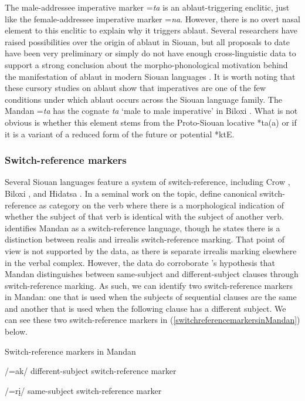The male-addressee imperative marker =\textit{ta} is an ablaut-triggering enclitic, just like the female-addressee imperative marker =\textit{na}. However, there is no overt nasal element to this enclitic to explain why it triggers ablaut. Several researchers have raised possibilities over the origin of ablaut in Siouan, but all proposals to date have been very preliminary or simply do not have enough cross-linguistic data to support a strong conclusion about the morpho-phonological motivation behind the manifestation of ablaut in modern Siouan languages \citep{rood1983,jones1983b,rankin1995}. It is worth noting that these cursory studies on ablaut show that imperatives are one of the few conditions under which ablaut occurs across the Siouan language family. The Mandan =\textit{ta} has the cognate \textit{ta} `male to male imperative' in Biloxi \citep[88]{einaudi1976}. What is not obvious is whether this element stems from the Proto-Siouan locative *ta(a) or if it is a variant of a reduced form of the future or potential *ktE. 

\subsubsection{Switch-reference markers}\label{SecSwitchReference}

Several Siouan languages feature a system of switch-reference, including  Crow \citep{graczyk1987}, Biloxi \citep{graczyk1997}, and Hidatsa \citep{boyle2011}. In a seminal work on the topic, \citet[ix]{haimanmunro1983} define canonical switch-reference as category on the verb where there is a morphological indication of whether the subject of that verb is identical with the subject of another verb. \citet{mixco1997b} identifies Mandan as a switch-reference language, though he states there is a distinction between realis and irrealis switch-reference marking. That point of view is not supported by the data, as there is separate irrealis marking elsewhere in the verbal complex. However, the data do corroborate \citeauthor{mixco1997b}'s hypothesis that Mandan distinguishes between same-subject and different-subject clauses through switch-reference marking. As such, we can identify two switch-reference markers in Mandan: one that is used when the subjects of sequential clauses are the same and another that is used when the following clause has a different subject. We can see these two switch-reference markers in (\ref{switchreferencemarkersinMandan}) below.

\begin{exe}

\item\label{switchreferencemarkersinMandan} Switch-reference markers in Mandan

\begin{xlist}
    
\item /=ak/ different-subject switch-reference marker

\item /=rį/ same-subject switch-reference marker

\end{xlist}

\end{exe}


